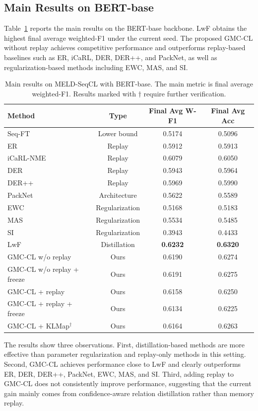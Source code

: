 \subsection{Main Results on BERT-base}
\label{subsec:main_results}

Table~\ref{tab:bert_main_results} reports the main results on the BERT-base backbone. LwF obtains the highest final average weighted-F1 under the current seed. The proposed GMC-CL without replay achieves competitive performance and outperforms replay-based baselines such as ER, iCaRL, DER, DER++, and PackNet, as well as regularization-based methods including EWC, MAS, and SI.

\begin{table}[t]
\centering
\caption{Main results on MELD-SeqCL with BERT-base. The main metric is final average weighted-F1. Results marked with $\dagger$ require further verification.}
\label{tab:bert_main_results}
\begin{tabular}{lccc}
\hline
Method & Type & Final Avg W-F1 & Final Avg Acc \\
\hline
Seq-FT & Lower bound & 0.5174 & 0.5096 \\
ER & Replay & 0.5912 & 0.5913 \\
iCaRL-NME & Replay & 0.6079 & 0.6050 \\
DER & Replay & 0.5943 & 0.5964 \\
DER++ & Replay & 0.5969 & 0.5990 \\
PackNet & Architecture & 0.5622 & 0.5589 \\
EWC & Regularization & 0.5168 & 0.5183 \\
MAS & Regularization & 0.5534 & 0.5485 \\
SI & Regularization & 0.3943 & 0.4433 \\
LwF & Distillation & \textbf{0.6232} & \textbf{0.6320} \\
GMC-CL w/o replay & Ours & 0.6190 & 0.6274 \\
GMC-CL w/o replay + freeze & Ours & 0.6191 & 0.6275 \\
GMC-CL + replay & Ours & 0.6158 & 0.6250 \\
GMC-CL + replay + freeze & Ours & 0.6134 & 0.6225 \\
GMC-CL + KLMap$^\dagger$ & Ours & 0.6164 & 0.6263 \\
\hline
\end{tabular}
\end{table}

The results show three observations. First, distillation-based methods are more effective than parameter regularization and replay-only methods in this setting. Second, GMC-CL achieves performance close to LwF and clearly outperforms ER, DER, DER++, PackNet, EWC, MAS, and SI. Third, adding replay to GMC-CL does not consistently improve performance, suggesting that the current gain mainly comes from confidence-aware relation distillation rather than memory replay.

